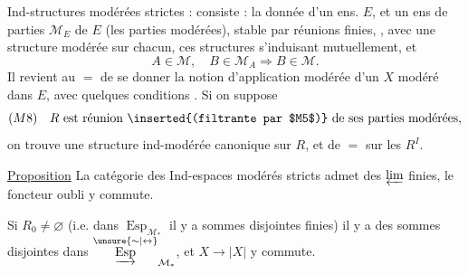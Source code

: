 Ind-structures modérées strictes   : consiste : la donnée d'un ens. $E$, et un ens de parties $\mathcal M_E$ de $E$ (les parties modérées), stable par réunions finies, , avec une structure modérée sur chacun, ces structures s'induisant mutuellement, et
\[
 A\in\mathcal M,\quad B\in\mathcal M_A\Longrightarrow B\in\mathcal M.
\]
Il revient au $=$ de se donner la notion d'application modérée d'un $X$ modéré dans $E$, avec  quelques conditions . Si on suppose
\[
 (M8)\quad R\text{ est réunion \inserted{(filtrante par $M5$)} de ses parties modérées},
\]
on trouve une structure ind-modérée canonique sur $R$, et de $=$ sur les $R^I$.

\uline{Proposition} La catégorie des   Ind-espaces modérés stricts admet des $\varprojlim$ finies, le foncteur oubli y commute.

Si $R_0\ne\varnothing$ (i.e. dans $\operatorname{Esp}_{\mathcal M_*}$ il y a sommes disjointes finies) il y a des sommes disjointes   dans $\overset{\unsure{\sim|\leftrightarrow}}{\underrightarrow{\operatorname{Esp}}}_{\mathcal M_*}$, et $X\longrightarrow |X|$ y commute.
